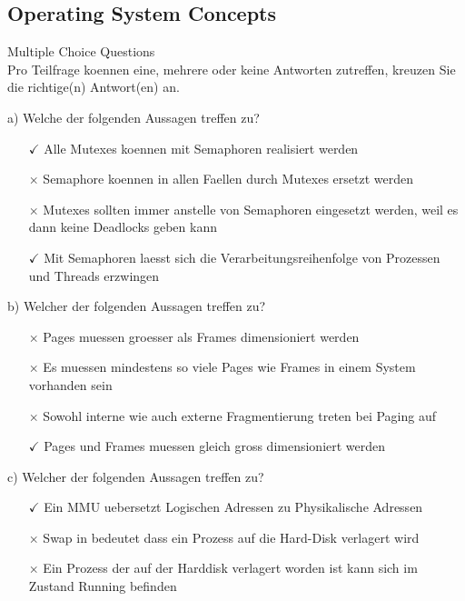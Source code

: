 \subsection{Operating System Concepts}

\begin{example2}{Multiple Choice Questions}\\
    Pro Teilfrage koennen eine, mehrere oder keine Antworten zutreffen, kreuzen Sie die richtige(n) Antwort(en) an.
    
    a) Welche der folgenden Aussagen treffen zu?
    \begin{itemize}
        \item[$\checkmark$] Alle Mutexes koennen mit Semaphoren realisiert werden
        \item[$\times$] Semaphore koennen in allen Faellen durch Mutexes ersetzt werden  
        \item[$\times$] Mutexes sollten immer anstelle von Semaphoren eingesetzt werden, weil es dann keine Deadlocks geben kann
        \item[$\checkmark$] Mit Semaphoren laesst sich die Verarbeitungsreihenfolge von Prozessen und Threads erzwingen
    \end{itemize}
    
    b) Welcher der folgenden Aussagen treffen zu?
    \begin{itemize}
        \item[$\times$] Pages muessen groesser als Frames dimensioniert werden
        \item[$\times$] Es muessen mindestens so viele Pages wie Frames in einem System vorhanden sein
        \item[$\times$] Sowohl interne wie auch externe Fragmentierung treten bei Paging auf
        \item[$\checkmark$] Pages und Frames muessen gleich gross dimensioniert werden
    \end{itemize}
    
    c) Welcher der folgenden Aussagen treffen zu?
    \begin{itemize}
        \item[$\checkmark$] Ein MMU uebersetzt Logischen Adressen zu Physikalische Adressen
        \item[$\times$] Swap in bedeutet dass ein Prozess auf die Hard-Disk verlagert wird
        \item[$\times$] Ein Prozess der auf der Harddisk verlagert worden ist kann sich im Zustand Running befinden
    \end{itemize}
    

\end{example2}
